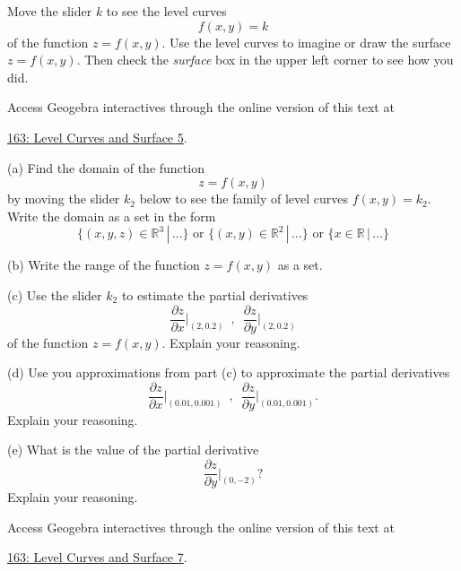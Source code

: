 \documentclass{ximera}
\begin{document}
\begin{example}  \label{Ed5465f45}
Move the slider $k$ to see the level curves 
\[
    f(x,y)=k
\]
of the function $z=f(x,y)$. Use the level curves to imagine or draw the surface $z=f(x,y)$. Then check the \emph{surface} box in the upper left corner to see how you did. 


 
\begin{onlineOnly}
    \begin{center}
\end{center}
\end{onlineOnly}

Access Geogebra interactives through the online version of this text at
 
\href{https://www.geogebra.org/classic/xgj5cv9x}{163: Level Curves and Surface 5}.
\end{example}



\begin{question}  \label{E45hh6f45}
(a) Find the domain of the function
\[
   z = f(x,y) 
\]
by moving the slider $k_2$ below to see the family of level curves $f(x,y)=k_2$. Write the domain as a set in the form
\[
   \{  (x,y,z) \in \mathbb{R}^3 \, | \, \ldots    \} \text{ or } \{  (x,y) \in \mathbb{R}^2 \, | \, \ldots    \} \text{ or } \{  x \in \mathbb{R} \, | \, \ldots    \}
\]


(b) Write the range of the function $z=f(x,y)$ as a set.


(c) Use the slider $k_2$ to estimate the partial derivatives
\[
    \frac{\partial z}{\partial x}\Big|_{(2,0.2)} \,\,\, , \,\,\,   \frac{\partial z}{\partial y}\Big|_{(2,0.2)}
\]
of the function $z=f(x,y)$. Explain your reasoning.

(d) Use you approximations from part (c) to approximate the partial derivatives
\[
    \frac{\partial z}{\partial x}\Big|_{(0.01,0.001)} \,\,\, , \,\,\,   \frac{\partial z}{\partial y}\Big|_{(0.01,0.001)} .
\]
Explain your reasoning.

(e) What is the value of the partial derivative
\[
   \frac{\partial z}{\partial y}\Big|_{(0,-2)} ?
\]
Explain your reasoning.

 
\begin{onlineOnly}
    \begin{center}
\end{center}
\end{onlineOnly}

Access Geogebra interactives through the online version of this text at
 
\href{https://www.geogebra.org/classic/ehscekb6}{163: Level Curves and Surface 7}.
\end{question}
\end{document}
